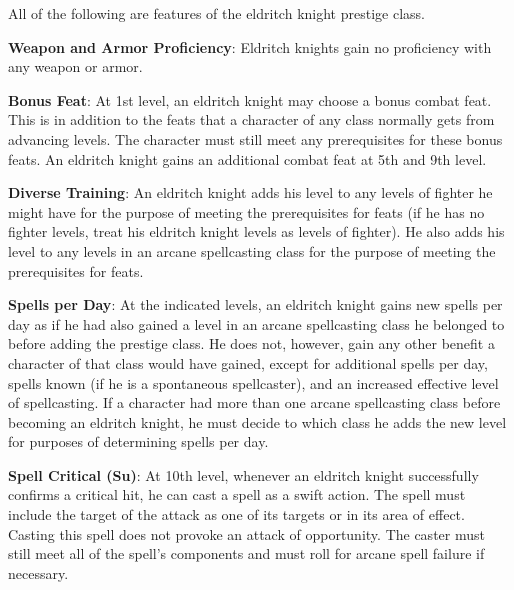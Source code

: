 				
All of the following are features of the eldritch knight prestige class.
				
\textbf{Weapon and Armor Proficiency}: Eldritch knights gain no proficiency with any weapon or armor.
				
\textbf{Bonus Feat}: At 1st level, an eldritch knight may choose a bonus combat feat. This is in addition to the feats that a character of any class normally gets from advancing levels. The character must still meet any prerequisites for these bonus feats. An eldritch knight gains an additional combat feat at 5th and 9th level.
				
\textbf{Diverse Training}: An eldritch knight adds his level to any levels of fighter he might have for the purpose of meeting the prerequisites for feats (if he has no fighter levels, treat his eldritch knight levels as levels of fighter). He also adds his level to any levels in an arcane spellcasting class for the purpose of meeting the prerequisites for feats.
				
\textbf{Spells per Day}: At the indicated levels, an eldritch knight gains new spells per day as if he had also gained a level in an arcane spellcasting class he belonged to before adding the prestige class. He does not, however, gain any other benefit a character of that class would have gained, except for additional spells per day, spells known (if he is a spontaneous spellcaster), and an increased effective level of spellcasting. If a character had more than one arcane spellcasting class before becoming an eldritch knight, he must decide to which class he adds the new level for purposes of determining spells per day.
				
\textbf{Spell Critical (Su)}: At 10th level, whenever an eldritch knight successfully confirms a critical hit, he can cast a spell as a swift action. The spell must include the target of the attack as one of its targets or in its area of effect. Casting this spell does not provoke an attack of opportunity. The caster must still meet all of the spell's components and must roll for arcane spell failure if necessary.
        	

